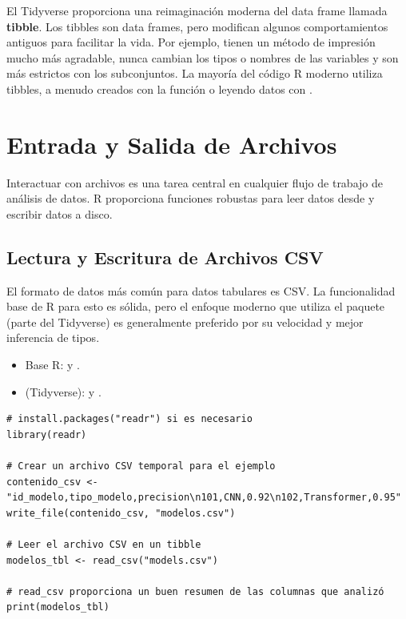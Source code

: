 \begin{remark}
El Tidyverse proporciona una reimaginación moderna del data frame llamada \textbf{tibble}. Los tibbles son data frames, pero modifican algunos comportamientos antiguos para facilitar la vida. Por ejemplo, tienen un método de impresión mucho más agradable, nunca cambian los tipos o nombres de las variables y son más estrictos con los subconjuntos. La mayoría del código R moderno utiliza tibbles, a menudo creados con la función  o leyendo datos con .
\end{remark}

\section{Entrada y Salida de Archivos}
\label{sec:r_files}
Interactuar con archivos es una tarea central en cualquier flujo de trabajo de análisis de datos. R proporciona funciones robustas para leer datos desde y escribir datos a disco.

\subsection*{Lectura y Escritura de Archivos CSV}
El formato de datos más común para datos tabulares es CSV. La funcionalidad base de R para esto es sólida, pero el enfoque moderno que utiliza el paquete  (parte del Tidyverse) es generalmente preferido por su velocidad y mejor inferencia de tipos.
\begin{itemize}
    \item Base R:  y .
    \item {} (Tidyverse):  y .
\end{itemize}

\begin{example}
\text{ }\begin{verbatim}
# install.packages("readr") si es necesario
library(readr)

# Crear un archivo CSV temporal para el ejemplo
contenido_csv <- "id_modelo,tipo_modelo,precision\n101,CNN,0.92\n102,Transformer,0.95"
write_file(contenido_csv, "modelos.csv")

# Leer el archivo CSV en un tibble
modelos_tbl <- read_csv("models.csv")

# read_csv proporciona un buen resumen de las columnas que analizó
print(modelos_tbl)
\end{verbatim}
\end{example}


